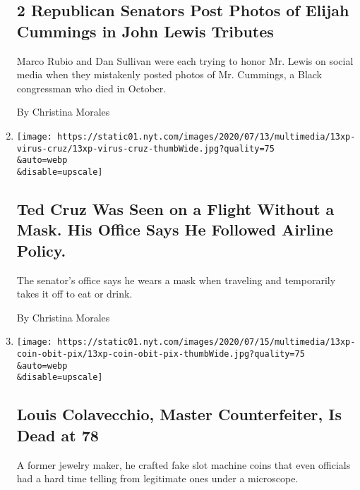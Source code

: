 \begin{enumerate}
{  \subsection{2 Republican Senators Post Photos of Elijah Cummings in
  John Lewis
  Tributes}\label{2-republican-senators-post-photos-of-elijah-cummings-in-john-lewis-tributes}}

  Marco Rubio and Dan Sullivan were each trying to honor Mr. Lewis on
  social media when they mistakenly posted photos of Mr. Cummings, a
  Black congressman who died in October.

  By Christina Morales
\item
  \href{/2020/07/13/us/politics/ted-cruz-wearing-no-mask.html}{}

  \texttt{[image: https://static01.nyt.com/images/2020/07/13/multimedia/13xp-virus-cruz/13xp-virus-cruz-thumbWide.jpg?quality=75\\\&auto=webp\\\&disable=upscale]}

  \hypertarget{ted-cruz-was-seen-on-a-flight-without-a-mask-his-office-says-he-followed-airline-policy}{%
  \subsection{Ted Cruz Was Seen on a Flight Without a Mask. His Office
  Says He Followed Airline
  Policy.}\label{ted-cruz-was-seen-on-a-flight-without-a-mask-his-office-says-he-followed-airline-policy}}

  The senator's office says he wears a mask when traveling and
  temporarily takes it off to eat or drink.

  By Christina Morales
\item
  \href{/2020/07/13/us/louis-colavecchio-dead.html}{}

  \texttt{[image: https://static01.nyt.com/images/2020/07/15/multimedia/13xp-coin-obit-pix/13xp-coin-obit-pix-thumbWide.jpg?quality=75\\\&auto=webp\\\&disable=upscale]}

  \hypertarget{louis-colavecchio-master-counterfeiter-is-dead-at-78}{%
  \subsection{Louis Colavecchio, Master Counterfeiter, Is Dead at
  78}\label{louis-colavecchio-master-counterfeiter-is-dead-at-78}}

  A former jewelry maker, he crafted fake slot machine coins that even
  officials had a hard time telling from legitimate ones under a
  microscope.


\end{enumerate}
